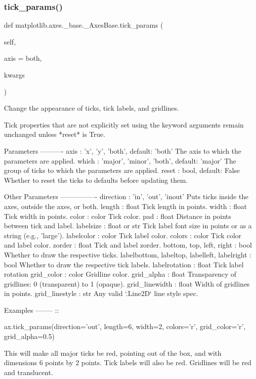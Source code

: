 \subsubsection{\texorpdfstring{tick\+\_\+params()}{tick\_params()}}
{\footnotesize\ttfamily def matplotlib.\+axes.\+\_\+base.\+\_\+\+Axes\+Base.\+tick\+\_\+params (\begin{DoxyParamCaption}\item[{}]{self,  }\item[{}]{axis = {\ttfamily \textquotesingle{}both\textquotesingle{}},  }\item[{}]{kwargs }\end{DoxyParamCaption})}

\begin{DoxyVerb}Change the appearance of ticks, tick labels, and gridlines.

Tick properties that are not explicitly set using the keyword
arguments remain unchanged unless *reset* is True.

Parameters
----------
axis : {'x', 'y', 'both'}, default: 'both'
    The axis to which the parameters are applied.
which : {'major', 'minor', 'both'}, default: 'major'
    The group of ticks to which the parameters are applied.
reset : bool, default: False
    Whether to reset the ticks to defaults before updating them.

Other Parameters
----------------
direction : {'in', 'out', 'inout'}
    Puts ticks inside the axes, outside the axes, or both.
length : float
    Tick length in points.
width : float
    Tick width in points.
color : color
    Tick color.
pad : float
    Distance in points between tick and label.
labelsize : float or str
    Tick label font size in points or as a string (e.g., 'large').
labelcolor : color
    Tick label color.
colors : color
    Tick color and label color.
zorder : float
    Tick and label zorder.
bottom, top, left, right : bool
    Whether to draw the respective ticks.
labelbottom, labeltop, labelleft, labelright : bool
    Whether to draw the respective tick labels.
labelrotation : float
    Tick label rotation
grid_color : color
    Gridline color.
grid_alpha : float
    Transparency of gridlines: 0 (transparent) to 1 (opaque).
grid_linewidth : float
    Width of gridlines in points.
grid_linestyle : str
    Any valid `.Line2D` line style spec.

Examples
--------
::

    ax.tick_params(direction='out', length=6, width=2, colors='r',
           grid_color='r', grid_alpha=0.5)

This will make all major ticks be red, pointing out of the box,
and with dimensions 6 points by 2 points.  Tick labels will
also be red.  Gridlines will be red and translucent.\end{DoxyVerb}
 \mbox{\label{classmatplotlib_1_1axes_1_1__base_1_1__AxesBase_a62e28856d1bc2662e2d2a292d445b1b3}} 

